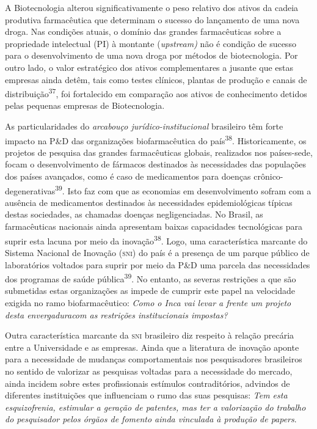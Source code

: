 \documentclass{article}
\begin{document}
A Biotecnologia alterou significativamente o peso relativo dos ativos da cadeia
produtiva farmacêutica que determinam o sucesso do lançamento de uma nova droga.
Nas condições atuais, o domínio das grandes farmacêuticas sobre a propriedade
intelectual (PI) à montante (\textit{upstream)}
não é condição de sucesso para o desenvolvimento de uma nova droga por métodos
de biotecnologia. Por outro lado\textit{,}
o valor estratégico dos ativos complementares a jusante que estas empresas ainda
detêm, tais como testes clínicos, plantas de produção e canais de
distribuição\textsuperscript{37}, foi fortalecido em comparação aos ativos de conhecimento detidos pelas
pequenas empresas de Biotecnologia.

As particularidades do \textit{arcabouço jurídico-institucional}
brasileiro têm forte impacto na P\&D das organizações biofarmacêutica do
país\textsuperscript{38}. Historicamente, os projetos de pesquisa das grandes farmacêuticas globais,
realizados nos países-sede, focam o desenvolvimento de fármacos destinados às
necessidades das populações dos países avançados, como é caso de medicamentos
para doenças crônico-degenerativas\textsuperscript{39}. Isto faz com que as economias em desenvolvimento sofram com a ausência de
medicamentos destinados às necessidades epidemiológicas típicas destas
sociedades, as chamadas doenças negligenciadas. No Brasil, as farmacêuticas
nacionais ainda apresentam baixas capacidades tecnológicas para suprir esta
lacuna por meio da inovação\textsuperscript{38}. Logo, uma característica marcante do Sistema Nacional de Inovação (\textsc{sni}) do
país é a presença de um parque público de laboratórios voltados para suprir por
meio da P\&D uma parcela das necessidades dos programas de saúde
pública\textsuperscript{39}. No entanto, as severas restrições a que são submetidas estas organizações as
impede de cumprir este papel na velocidade exigida no ramo biofarmacêutico:
\textit{Como o Inca vai levar a frente um projeto desta envergaduracom as
restrições institucionais impostas?}

Outra característica marcante da \textsc{sni} brasileiro diz respeito à relação precária
entre a Universidade e as empresas. Ainda que a literatura de inovação aponte
para a necessidade de mudanças comportamentais nos pesquisadores brasileiros no
sentido de valorizar as pesquisas voltadas para a necessidade do mercado, ainda
incidem sobre estes profissionais estímulos contraditórios, advindos de
diferentes instituições que influenciam o rumo das suas pesquisas: \textit{Tem
esta esquizofrenia, estimular a geração de patentes, mas ter a valorização do
trabalho do pesquisador pelos órgãos de fomento ainda vinculada à produção de
papers}.
\end{document}
